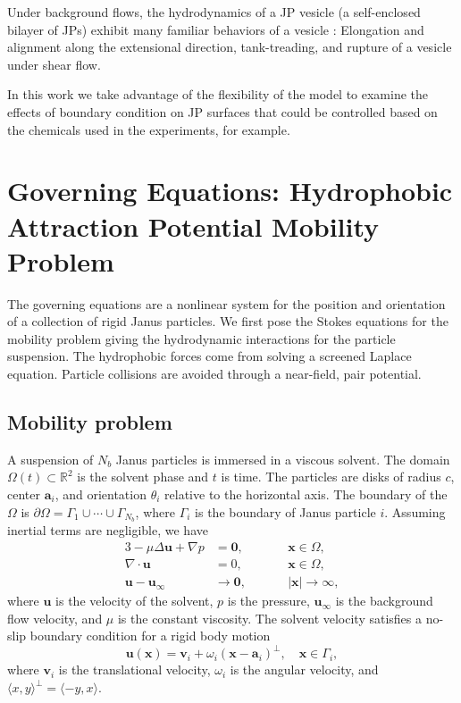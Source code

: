 \documentclass[aps,prl,preprint,groupedaddress]{revtex4-2}
\renewcommand{\aa}{\mathbf{a}}
\newcommand{\bd}{\partial}
\newcommand{\xx}{\mathbf{x}}
\newcommand{\uu}{\mathbf{u}}
\renewcommand{\vv}{\mathbf{v}}
\begin{document}
Under background flows, the hydrodynamics of a JP vesicle (a self-enclosed bilayer of JPs) exhibit many familiar behaviors of a vesicle \cite{Fu2022_JFM}: 
Elongation and alignment along the extensional direction, tank-treading, and rupture of a vesicle under shear flow.

In this work we take advantage of the flexibility of the model to examine the effects of boundary condition on JP surfaces that could be controlled based on the chemicals used in the experiments, for example.

\section{Governing Equations: Hydrophobic Attraction Potential Mobility Problem} 
The governing equations are a nonlinear system
for the position and orientation of a collection of
rigid Janus particles.
We first pose the Stokes equations
for the mobility problem giving the hydrodynamic interactions
for the particle suspension.  
The hydrophobic forces come from solving a screened Laplace equation.
Particle collisions are avoided through a near-field, pair
potential.

\subsection{Mobility problem}
A suspension of $N_b$ Janus particles is immersed in a viscous solvent.
The domain $\Omega(t) \subset \mathbb{R}^2$ is the solvent phase
and $t$ is time.
The particles are disks of radius $c$, center $\aa_i$, and
orientation $\theta_i$ relative to the horizontal axis.  
The boundary of the $\Omega$ is $\bd\Omega = \Gamma_1 \cup
\cdots \cup \Gamma_{N_b}$, where $\Gamma_i$ is the boundary of Janus
particle $i$. Assuming inertial terms are
negligible, we have 
\begin{alignat}{3}
\label{eq:stokes}
  -\mu \Delta \uu + \nabla p &= \mathbf{0},     && \xx \in \Omega, \\
  \nabla\cdot \uu &= 0, \qquad && \xx \in \Omega, \\
  \uu - \uu_\infty &\to \mathbf{0}, && |\xx| \to \infty,
\end{alignat}
where $\uu$ is the velocity of the solvent,
$p$ is the pressure, $\uu_\infty$ is the
background flow velocity, and $\mu$ is the constant viscosity.
The solvent velocity satisfies a no-slip boundary
condition for a rigid body motion
\begin{equation}
  \label{eq:rigid-vel}
  \uu(\xx) = \vv_i + \omega_i (\xx - \aa_i)^\perp, 
    \quad \xx \in \Gamma_i,
\end{equation}
where $\vv_i$ is the translational velocity, $\omega_i$ is the
angular velocity, and
$\langle x, y \rangle^{\perp} = \langle -y, x\rangle$.
\end{document}
